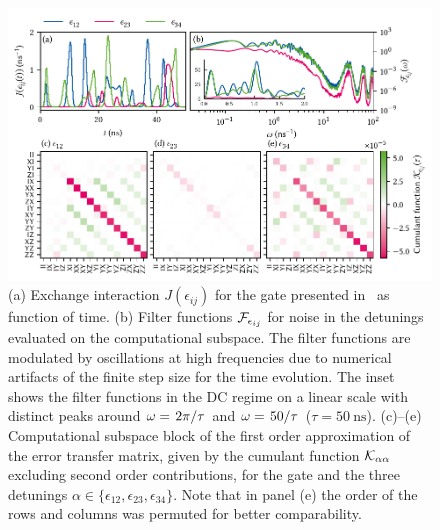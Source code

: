 \begin{figure}
    \centering
    \includegraphics{img/pdf/filter_functions/CNOT_FF}
    \caption[]{
        (a) Exchange interaction $J(\epsilon_{ij})$ for the \CNOT gate presented in~ as function of time.
        (b) Filter functions $\mathcal{F}_{\epsilon_{ij}}$ for noise in the detunings evaluated on the computational subspace.
        The filter functions are modulated by oscillations at high frequencies due to numerical artifacts of the finite step size for the time evolution.
        The inset shows the filter functions in the DC regime on a linear scale with distinct peaks around $\omega = \flatfrac{2\pi}{\tau}$ and $\omega = \flatfrac{50}{\tau}$ ($\tau = \qty{50}{\nano\second}$).
        (c)--(e) Computational subspace block of the first order approximation of the error transfer matrix, given by the cumulant function $\mathcal{K}_{\alpha\alpha}$ excluding second order contributions, for the \CNOT gate and the three detunings $\alpha\in\lbrace\epsilon_{12},\epsilon_{23},\epsilon_{34}\rbrace$.
        Note that in panel (e) the order of the rows and columns was permuted for better comparability.
    }
    \label{fig:ff:CNOT}
\end{figure}

